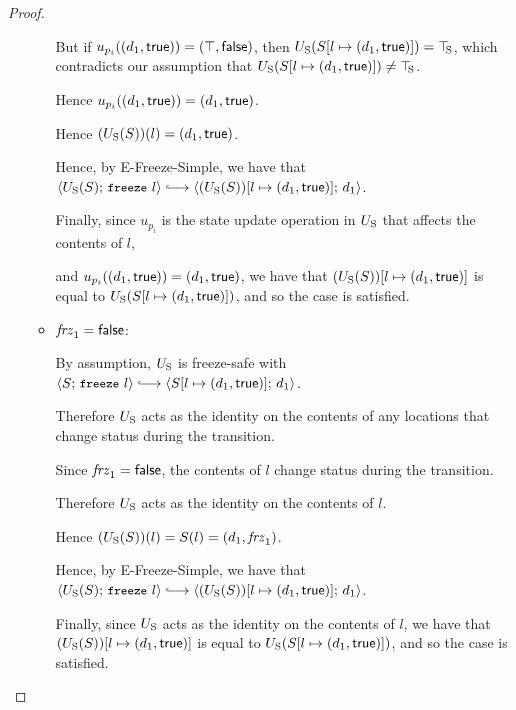 \begin{proof}
\begin{itemize}
\begin{itemize}
      But if $u_{p_i}((d_1, \textsf{true})) =
      (\top, \textsf{false})$, then
      $U_{\mathrm{S}}(S[l \mapsto (d_1, \textsf{true})]) = \top\hspace{-0.85mm}_{\mathrm{S}}$, which contradicts
      our assumption that $U_{\mathrm{S}}(S[l \mapsto (d_1, \textsf{true})]) \neq
      \top\hspace{-0.85mm}_{\mathrm{S}}$.

      Hence $u_{p_i}((d_1, \textsf{true})) =
      (d_1, \textsf{true})$.

      Hence $(U_{\mathrm{S}}(S))(l) = (d_1, \textsf{true})$.

      Hence, by {\sc E-Freeze-Simple}, we have that
      $\config{\Ustore(S)}{\freeze{l}} \parstepsto
      \\ \config{\extS{(\Ustore(S))}{l}{d_1}{\frozentrue}}{d_1}$.

      Finally, since $u_{p_i}$ is the state update operation in $U_{\mathrm{S}}$
      that affects the contents of $l$,

      and $u_{p_i}((d_1, \textsf{true})) =
      (d_1, \textsf{true})$, we have that
      $(U_{\mathrm{S}}(S))[l \mapsto (d_1, \textsf{true})]$ is equal to
      $U_{\mathrm{S}}(S[l \mapsto (d_1, \textsf{true})])$, and so the case is
      satisfied.

    \item $\mathit{frz}_1 = \textsf{false}$:

      By assumption, $U_{\mathrm{S}}$ is freeze-safe with $\config{S}{\freeze{l}}
      \parstepsto \config{\extS{S}{l}{d_1}{\frozentrue}}{d_1}$.

      Therefore $U_{\mathrm{S}}$ acts as the identity on the contents of any
      locations that change status during the transition.

      Since $\mathit{frz}_1 = \textsf{false}$, the contents of $l$ change
      status during the transition.

      Therefore $U_{\mathrm{S}}$ acts as the identity on the contents of $l$.

      Hence $(U_{\mathrm{S}}(S))(l) = S(l) = (d_1, \mathit{frz}_1)$.

      Hence, by {\sc E-Freeze-Simple}, we have that
      $\config{\Ustore(S)}{\freeze{l}} \parstepsto
      \\ \config{\extS{(\Ustore(S))}{l}{d_1}{\frozentrue}}{d_1}$.

      Finally, since $U_{\mathrm{S}}$ acts as the identity on the contents of
      $l$, we have that $(U_{\mathrm{S}}(S))[l \mapsto (d_1, \textsf{true})]$ is
      equal to $U_{\mathrm{S}}(S[l \mapsto (d_1, \textsf{true})])$, and so the case
      is satisfied.
    \end{itemize}

  \end{itemize}
\end{proof}
